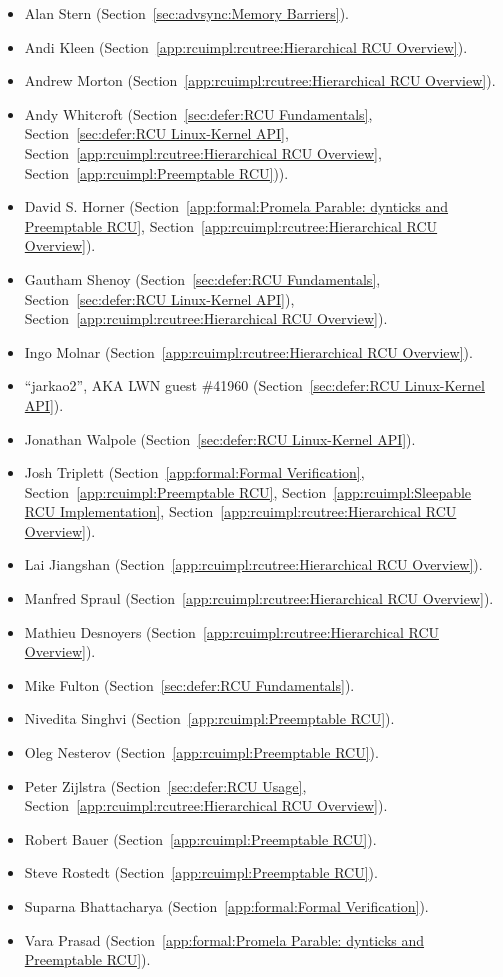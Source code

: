 \begin{itemize}
\item	Alan Stern (Section~\ref{sec:advsync:Memory Barriers}).
\item	Andi Kleen (Section~\ref{app:rcuimpl:rcutree:Hierarchical RCU Overview}).
\item	Andrew Morton (Section~\ref{app:rcuimpl:rcutree:Hierarchical RCU Overview}).
\item	Andy Whitcroft (Section~\ref{sec:defer:RCU Fundamentals},
	Section~\ref{sec:defer:RCU Linux-Kernel API},
	Section~\ref{app:rcuimpl:rcutree:Hierarchical RCU Overview},
	Section~\ref{app:rcuimpl:Preemptable RCU})).
\item	David S. Horner
	(Section~\ref{app:formal:Promela Parable: dynticks and Preemptable RCU},
	Section~\ref{app:rcuimpl:rcutree:Hierarchical RCU Overview}).
\item	Gautham Shenoy (Section~\ref{sec:defer:RCU Fundamentals},
	Section~\ref{sec:defer:RCU Linux-Kernel API}),
	Section~\ref{app:rcuimpl:rcutree:Hierarchical RCU Overview}).
\item	Ingo Molnar (Section~\ref{app:rcuimpl:rcutree:Hierarchical RCU Overview}).
\item	``jarkao2'', AKA LWN guest \#41960 (Section~\ref{sec:defer:RCU Linux-Kernel API}).
\item	Jonathan Walpole (Section~\ref{sec:defer:RCU Linux-Kernel API}).
\item	Josh Triplett
	(Section~\ref{app:formal:Formal Verification},
	Section~\ref{app:rcuimpl:Preemptable RCU},
	Section~\ref{app:rcuimpl:Sleepable RCU Implementation},
	Section~\ref{app:rcuimpl:rcutree:Hierarchical RCU Overview}).
\item	Lai Jiangshan (Section~\ref{app:rcuimpl:rcutree:Hierarchical RCU Overview}).
\item	Manfred Spraul (Section~\ref{app:rcuimpl:rcutree:Hierarchical RCU Overview}).
\item	Mathieu Desnoyers (Section~\ref{app:rcuimpl:rcutree:Hierarchical RCU Overview}).
\item	Mike Fulton (Section~\ref{sec:defer:RCU Fundamentals}).
\item	Nivedita Singhvi (Section~\ref{app:rcuimpl:Preemptable RCU}).
\item	Oleg Nesterov (Section~\ref{app:rcuimpl:Preemptable RCU}).
\item	Peter Zijlstra
	(Section~\ref{sec:defer:RCU Usage}, %
	Section~\ref{app:rcuimpl:rcutree:Hierarchical RCU Overview}).
\item	Robert Bauer (Section~\ref{app:rcuimpl:Preemptable RCU}).
\item	Steve Rostedt (Section~\ref{app:rcuimpl:Preemptable RCU}).
\item	Suparna Bhattacharya
	(Section~\ref{app:formal:Formal Verification}).
\item	Vara Prasad
	(Section~\ref{app:formal:Promela Parable: dynticks and Preemptable RCU}).
\end{itemize}

